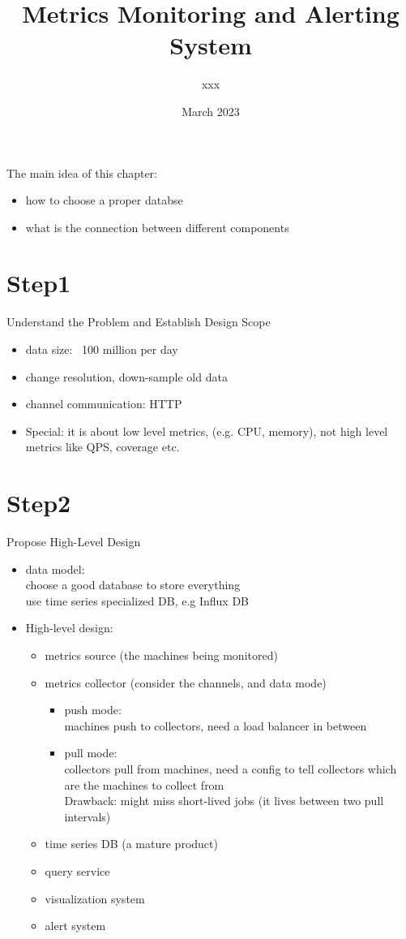 \documentclass{article}
\title{Metrics Monitoring and Alerting System}
\author{xxx}
\date{March 2023}
\begin{document}
\maketitle

The main idea of this chapter:\\
\begin{itemize}
    \item how to choose a proper databse
    \item what is the connection between different components
\end{itemize}
\section{Step1}
Understand the Problem and Establish Design Scope\\
\begin{itemize}
    \item data size: ~100 million per day
    \item change resolution, down-sample old data
    \item channel communication: HTTP
    \item Special: it is about low level metrics, (e.g. CPU, memory), not high level metrics like QPS, coverage etc.
\end{itemize}
\section{Step2}
Propose High-Level Design\\
\begin{itemize}
    \item data model:\\
    choose a good database to store everything\\
    use time series specialized DB, e.g Influx DB
    \item High-level design:\\
    \begin{itemize}
        \item metrics source (the machines being monitored)
        \item metrics collector (consider the channels, and data mode)
        \begin{itemize}
            \item push mode:\\
            machines push to collectors, need a load balancer in between
            \item pull mode:\\
            collectors pull from machines, need a config to tell collectors which are the machines to collect from\\
            Drawback: might miss short-lived jobs (it lives between two pull intervals)
        \end{itemize}
        \item time series DB (a mature product)
        \item query service
        \item visualization system
        \item alert system
    \end{itemize}
\end{itemize}
\end{document}
